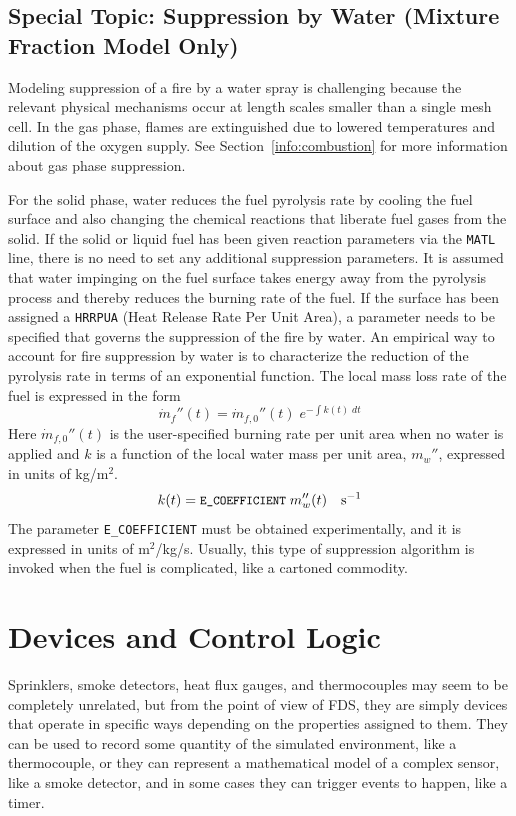 \documentclass[11pt]{book}
\newcommand{\ct}{\tt\small}
\newcommand{\dm}{\dot{m}}
\newcommand{\be}{\begin{equation}}
\newcommand{\ee}{\end{equation}}
\begin{document}
\section{Special Topic: Suppression by Water (Mixture Fraction Model Only)}
Modeling suppression of a fire by a water spray is challenging because
the relevant physical mechanisms occur at length scales smaller than a
single mesh cell. In the gas phase, flames are extinguished due to lowered
temperatures and dilution of the oxygen supply. See Section~\ref{info:combustion}
for more information about gas phase suppression.

For the solid phase,
water reduces the fuel pyrolysis rate by cooling the fuel surface and also
changing the chemical reactions that liberate fuel gases from the solid.
If the solid or liquid fuel has been given reaction parameters via the {\ct MATL} line, there is no
need to set any additional suppression parameters. It is assumed that
water impinging on the fuel surface takes energy away from the
pyrolysis process and thereby reduces the burning rate of the fuel.
If the surface has been assigned a {\ct HRRPUA} (Heat Release Rate Per Unit Area),
a parameter needs to be specified that governs the suppression of the fire by water.
An empirical way to account for fire suppression by water
is to characterize the reduction of the pyrolysis rate in terms
of an exponential function. The local mass loss rate of the
fuel is expressed in the form
\be \dm_f''(t) = \dm_{f,0}''(t) \; e^{-\int k(t) \; dt} \label{nistexting} \ee
Here $\dm_{f,0}''(t)$ is the user-specified burning rate per unit
area when no water is applied and $k$ is a function of the local water
mass per unit area, $m_w''$, expressed in units of kg/m$^2$.
\be
k(t) = \hbox{\ct E\_COEFFICIENT} \; m_w''(t) \quad          \hbox{s}^{-1}
\ee
The parameter {\ct E\_COEFFICIENT} must be obtained experimentally, and
it is expressed in units of m$^2$/kg/s. Usually, this type of suppression
algorithm is invoked when the fuel is complicated, like a cartoned commodity.



\clearpage

\chapter{Devices and Control Logic}

Sprinklers, smoke detectors, heat flux gauges, and thermocouples
may seem to be completely unrelated, but from the point of view
of FDS, they are simply devices that operate in specific ways depending
on the properties assigned to them. They can be used to record some
quantity of the simulated environment, like a thermocouple, or they can represent a mathematical model
of a complex sensor, like a smoke detector,
and in some cases they can trigger events to happen, like a timer.
\end{document}
